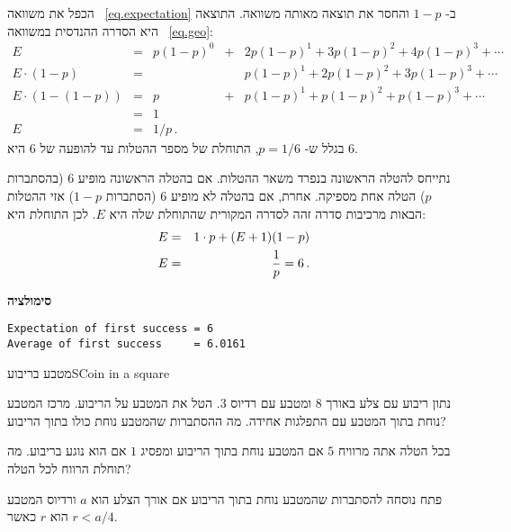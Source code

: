 
הכפל את משוואה%
~\ref{eq.expectation}
ב-%
$1-p$
והחסר את תוצאה מאותה משוואה. התוצאה היא הסדרה ההנדסית במשוואה%
~\ref{eq.geo}:
\[
\begin{array}{rclcl}
E&=&p(1-p)^0 &+&2p(1-p)^1+ 3p(1-p)^2+ 4p(1-p)^3 +\cdots\\
E\cdot(1-p)&=&&&p(1-p)^1 + 2p(1-p)^2+ 3p(1-p)^3 +\cdots \\
E\cdot(1-(1-p)) &=& p &+& p(1-p)^1 + p(1-p)^2 + p(1-p)^3 +\cdots\\
&=&1\\
E&=&1/p\,.
\end{array}
\]
בגלל ש-%
$p=1/6$,
התוחלת של מספר ההטלות עד להופעה של 
$6$
היא
$6$.


נתייחס להטלה הראשונה בנפרד משאר ההטלות. אם בהטלה הראשונה מופיע 
$6$
(בהסתברות
$p$)
הטלה אחת מספיקה. אחרת, אם בהטלה לא מופיע 
$6$
(הסתברות
$1-p$)
אזי ההטלות הבאות מרכיבות סדרה זהה לסדרה המקורית שהתוחלת שלה היא
$E$.
לכן התוחלת היא:
\begin{eqnarray*}
E &=& 1\cdot p + (E+1)(1-p)\\
E&=&\displaystyle\frac{1}{p}=6\,.
\end{eqnarray*}

\textbf{סימולציה}
\begin{verbatim}
Expectation of first success = 6
Average of first success     = 6.0161
\end{verbatim}


\begin{prob}{מטבע בריבוע}{S}{Coin in a square}

נתון ריבוע עם צלע באורך 
$8$
ומטבע עם רדיוס
$3$.
הטל את המטבע על הריבוע. מרכז המטבע נוחת בתוך המטבע עם התפלגות אחידה. מה ההסתברות שהמטבע נוחת כולו בתוך הריבוע?

בכל הטלה אתה מרוויח 
$5$
אם המטבע נוחת בתוך הריבוע ומפסיג
$1$
אם הוא נוגע בריבוע. מה תוחלת הרווח לכל הטלה?

פתח נוסחה להסתברות שהמטבע נוחת בתוך הריבוע אם אורך הצלע הוא 
$a$
ורדיוס המטבע הוא
$r$
כאשר
$r<a/4$.
\end{prob}

\solution{}

